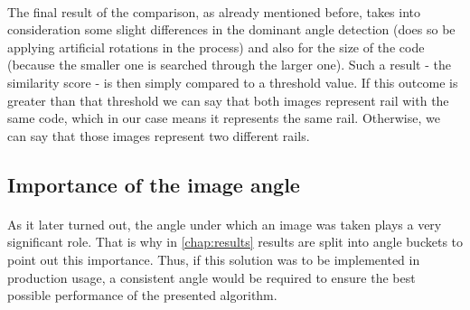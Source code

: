 \paragraph{}
The final result of the comparison, as already mentioned before, takes into consideration some slight differences in the dominant angle detection (does so be applying artificial rotations in the process) and also for the size of the code (because the smaller one is searched through the larger one). Such a result - the similarity score - is then simply compared to a threshold value. If this outcome is greater than that threshold we can say that both images represent rail with the same code, which in our case means it represents the same rail. Otherwise, we can say that those images represent two different rails.

\subsection{Importance of the image angle} \label{subsect:angle_importance}
\paragraph{}
As it later turned out, the angle under which an image was taken plays a very significant role. That is why in \autoref{chap:results} results are split into angle buckets to point out this importance. Thus, if this solution was to be implemented in production usage, a consistent angle would be required to ensure the best possible performance of the presented algorithm.










